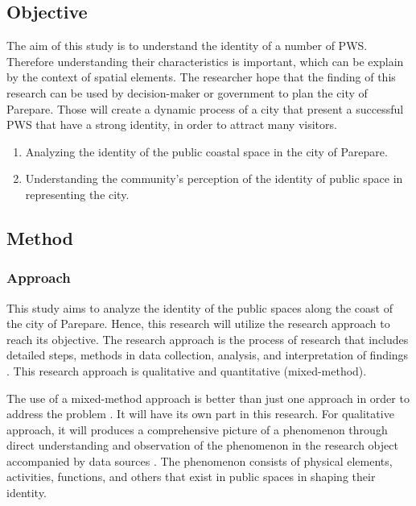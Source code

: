 \documentclass[draft, ../riset_senja.tex]{subfiles}
\begin{document}
\subsection{Objective}%
\label{sub:Objective}

The aim of this study is to understand the identity of a number of PWS. Therefore understanding their characteristics is important, which can be explain by the context of spatial elements. The researcher hope that the finding of this research can be used by decision-maker or government to plan the city of Parepare. Those will create a dynamic process of a city that present a successful PWS that have a strong identity, in order to attract many visitors.

\begin{enumerate}
	\item Analyzing the identity of the public coastal space in the city of Parepare.
	\item Understanding the community's perception of the identity of public space in representing the city.
\end{enumerate}


\subsection{Method}%
\label{sub:Method}

\subsubsection{Approach}%
\label{ssub:Approach}

This study aims to analyze the identity of the public spaces along the coast of the city of Parepare. Hence, this research will utilize the research approach to reach its objective.
The research approach is the process of research that includes detailed steps, methods in data collection, analysis, and interpretation of findings \citep{creswell2016}. This research approach is qualitative and quantitative (mixed-method).

The use of a mixed-method approach is better than just one approach in order to address the problem \citep{hartanti2019}. It will have its own part in this research. For qualitative approach, it will produces a comprehensive picture of a phenomenon through direct understanding and observation of the phenomenon in the research object accompanied by data sources \citep{creswell2016}.
The phenomenon consists of physical elements, activities, functions, and others that exist in public spaces in shaping their identity.
\end{document}
